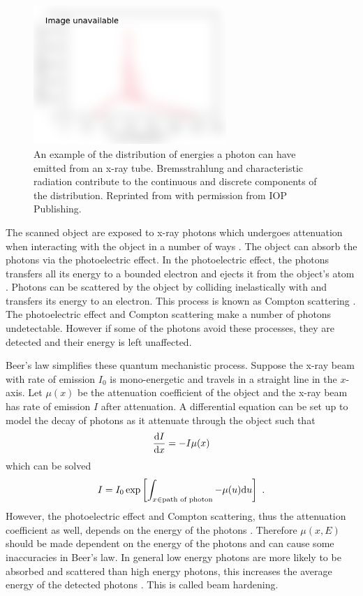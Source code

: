\begin{figure}
  \centering
  \includegraphics[width=0.65\textwidth]{../figures/literatureReview/literature_spectrum.png}
  \caption{An example of the distribution of energies a photon can have emitted from an x-ray tube. Bremsstrahlung and characteristic radiation contribute to the continuous and discrete components of the distribution. Reprinted from \cite{michael2001x} with permission from IOP Publishing.}
  \label{fig:literature_spectrum}
\end{figure}

The scanned object are exposed to x-ray photons which undergoes attenuation when interacting with the object in a number of ways \citep{cantatore2011introduction}. The object can absorb the photons via the photoelectric effect. In the photoelectric effect, the photons transfers all its energy to a bounded electron and ejects it from the object's atom \citep{millikan1916direct}. Photons can be scattered by the object by colliding inelastically with and transfers its energy to an electron. This process is known as Compton scattering \citep{compton1923quantum}. The photoelectric effect and Compton scattering make a number of photons undetectable. However if some of the photons avoid these processes, they are detected and their energy is left unaffected.

Beer's law simplifies these quantum mechanistic process. Suppose the x-ray beam with rate of emission $I_0$ is mono-energetic and travels in a straight line in the $x$-axis. Let $\mu(x)$ be the attenuation coefficient of the object and the x-ray beam has rate of emission $I$ after attenuation. A differential equation can be set up to model the decay of photons as it attenuate through the object such that
\begin{equation}
\dfrac{\mathrm{d} I}{\mathrm{d} x} = -I\mu(x)
\end{equation}
which can be solved
\begin{equation}
I = I_0\exp\left[\int_{x \in \text{path of photon}}-\mu(u)\mathrm{d} u\right] \ .
\label{eq:beerLaw}
\end{equation}
However, the photoelectric effect and Compton scattering, thus the attenuation coefficient as well, depends on the energy of the photons \citep{elbakri2002statistical}. Therefore $\mu(x,E)$ should be made dependent on the energy of the photons \citep{cantatore2011introduction} and can cause some inaccuracies in Beer's law. In general low energy photons are more likely to be absorbed and scattered than high energy photons, this increases the average energy of the detected photons \citep{sun2012overview}. This is called beam hardening.


